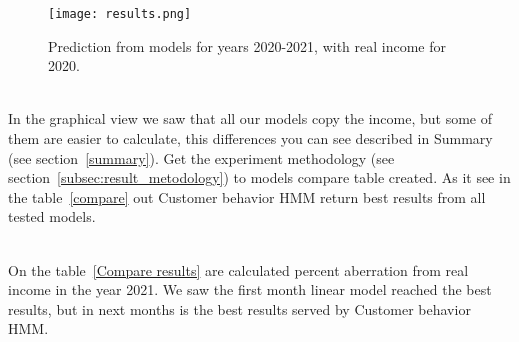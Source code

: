 \begin{figure}[h!]
    \begin{center}
        \texttt{[image: results.png]}
    \end{center}
    \caption{Prediction from models for years 2020-2021, with real income for 2020.}
    \label{results}
\end{figure}\\
In the graphical view we saw that all our models copy the income, but some of them are easier to calculate, this differences you can see described in Summary (see section~\ref{summary}).
Get the experiment methodology (see section~\ref{subsec:result_metodology}) to models compare table created.
As it see in the table~\ref{compare} out Customer behavior HMM return best results from all tested models.
\begin{table}[h!]
    \begin{center}
    \end{center}
    \caption{Compare fit of goodness for models.}
    \label{compare}
\end{table}\\
On the table~\ref{Compare results} are calculated percent aberration from real income in the year 2021.
We saw the first month linear model reached the best results, but in next months is the best results served by Customer behavior HMM.
